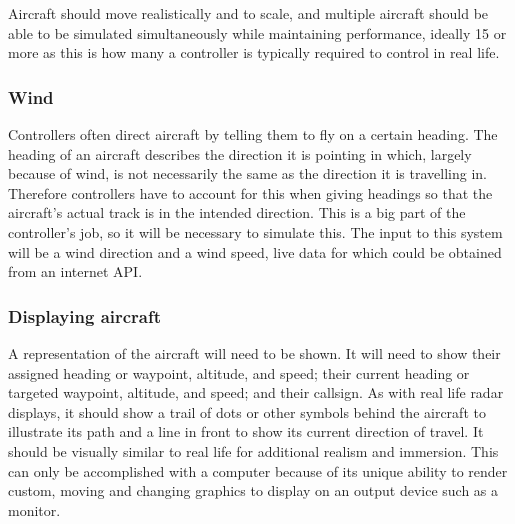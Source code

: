 \documentclass{article}
\begin{document}
Aircraft should move realistically and to scale, and multiple aircraft should be able to be simulated simultaneously while maintaining performance, ideally 15 or more as this is how many a controller is typically required to control in real life.

\subsubsection{Wind}
Controllers often direct aircraft by telling them to fly on a certain heading.
The heading of an aircraft describes the direction it is pointing in which, largely because of wind, is not necessarily the same as the direction it is travelling in.
Therefore controllers have to account for this when giving headings so that the aircraft's actual track is in the intended direction.
This is a big part of the controller's job, so it will be necessary to simulate this.
The input to this system will be a wind direction and a wind speed, live data for which could be obtained from an internet API.

\subsubsection{Displaying aircraft}
A representation of the aircraft will need to be shown.
It will need to show their assigned heading or waypoint, altitude, and speed; their current heading or targeted waypoint, altitude, and speed; and their callsign.
As with real life radar displays, it should show a trail of dots or other symbols behind the aircraft to illustrate its path and a line in front to show its current direction of travel.
It should be visually similar to real life for additional realism and immersion.
This can only be accomplished with a computer because of its unique ability to render custom, moving and changing graphics to display on an output device such as a monitor.
\end{document}
